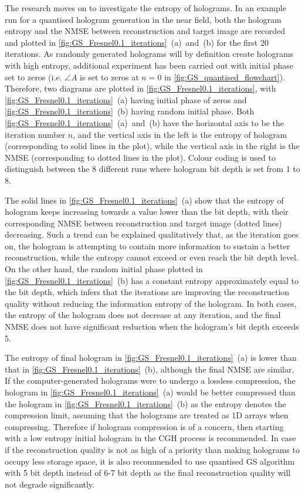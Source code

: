 	The research moves on to investigate the entropy of holograms. In an example run for a quantised hologram generation in the near field, both the hologram entropy and the NMSE between reconstruction and target image are recorded and plotted in \cref{fig:GS_Fresnel0.1_iterations}~(a)~and~(b) for the first 20 iterations. As randomly generated holograms will by definition create holograms with high entropy, additional experiment has been carried out with initial phase set to zeros (i.e. $\angle A$ is set to zeros at $n=0$ in \cref{fig:GS_quantised_flowchart}). Therefore, two diagrams are plotted in \cref{fig:GS_Fresnel0.1_iterations}, with \cref{fig:GS_Fresnel0.1_iterations}~(a) having initial phase of zeros and \cref{fig:GS_Fresnel0.1_iterations}~(b) having random initial phase. Both \cref{fig:GS_Fresnel0.1_iterations}~(a)~and~(b) have the horizontal axis to be the iteration number $n$, and the vertical axis in the left is the entropy of hologram (corresponding to solid lines in the plot), while the vertical axis in the right is the NMSE (corresponding to dotted lines in the plot). Colour coding is used to distinguish between the 8 different runs where hologram bit depth is set from 1 to 8.

	The solid lines in \cref{fig:GS_Fresnel0.1_iterations}~(a) show that the entropy of hologram keeps increasing towards a value lower than the bit depth, with their corresponding NMSE between reconstruction and target image (dotted lines) decreasing. Such a trend can be explained qualitatively that, as the iteration goes on, the hologram is attempting to contain more information to sustain a better reconstruction, while the entropy cannot exceed or even reach the bit depth level. On the other hand, the random initial phase plotted in \cref{fig:GS_Fresnel0.1_iterations}~(b) has a constant entropy approximately equal to the bit depth, which infers that the iterations are improving the reconstruction quality without reducing the information entropy of the hologram. In both cases, the entropy of the hologram does not decrease at any iteration, and the final NMSE does not have significant reduction when the hologram's bit depth exceeds 5.

	The entropy of final hologram in \cref{fig:GS_Fresnel0.1_iterations}~(a) is lower than that in \cref{fig:GS_Fresnel0.1_iterations}~(b), although the final NMSE are similar. If the computer-generated holograms were to undergo a lossless compression, the hologram in \cref{fig:GS_Fresnel0.1_iterations}~(a) would be better compressed than the hologram in \cref{fig:GS_Fresnel0.1_iterations}~(b) as the entropy denotes the compression limit, assuming that the holograms are treated as 1D arrays when compressing. Therefore if hologram compression is of a concern, then starting with a low entropy initial hologram in the CGH process is recommended. In case if the reconstruction quality is not as high of a priority than making holograms to occupy less storage space, it is also recommended to use quantised GS algorithm with 5 bit depth instead of 6-7 bit depth as the final reconstruction quality will not degrade significantly.



